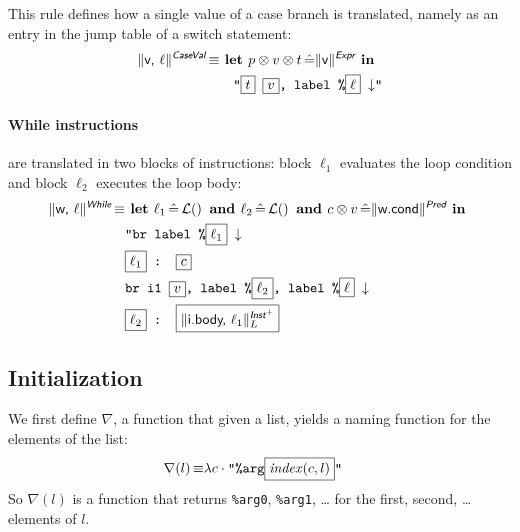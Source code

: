 \documentclass{llncs}
\newcommand{\trad}[2]{\ensuremath{\lVert \textsf{#1} \rVert^{\textit{#2}}}}
\newcommand{\nl}[0]{\ensuremath{\downarrow}}
\DeclareMathOperator{\isdef}{\equiv}
\DeclareMathOperator{\lbl}{\mathcal{L}()}
\newcommand{\llvm}[1]{\texttt{#1}}
\newcommand{\B}[1]{\textsf{#1}}
\newcommand{\ListOf}[1]{$\mbox{#1}^+$}
\newcommand{\LET}[0]{\textbf{ let }}
\DeclareMathOperator{\BE}{\hat{=}}
\newcommand{\IN}[0]{\textbf{ in }}
\newcommand{\AND}[0]{\textbf{ and }}
\newcommand{\PH}[1]{\framebox{$#1$}}
\newcommand{\sep}[0]{\otimes}
\begin{document}
This rule defines how a single value of a case branch is translated, namely
as an entry in the jump table of a switch statement:
\begin{align*}
  \trad{v, $\ell$}{\B{CaseVal}} \isdef & \LET p \sep v \sep t \BE \trad{v}{\B{Expr}} \IN \\
  & \quad \llvm{"\PH{t} \PH{v}, label \%\PH{\ell} \nl"}
\end{align*}

\paragraph{While instructions} are translated in two blocks of instructions:
block $\ell_1$ evaluates the loop condition and block $\ell_2$ executes the loop
body:
\begin{align*}
\begin{split}
\trad{w, $\ell$}{\B{While}} \isdef
  & \LET \ell_1 \BE \lbl \AND \ell_2 \BE \lbl \AND c \sep v \BE \trad{w.cond}{\B{Pred}} \IN \\
  & \llvm{"br label \%\PH{\ell_1} \nl} \\
  & \llvm{\PH{\ell_1} : \PH{c}} \\
  & \llvm{br i1 \PH{v}, label \%\PH{\ell_2}, label \%\PH{\ell} \nl} \\
  & \llvm{\PH{\ell_2} : \PH{\trad{i.body, $\ell_1$}{\ListOf{\B{Inst}}}_L}}
\end{split}
\end{align*}

\subsection{Initialization}
\label{sec:trad-init}

\newcommand{\argname}[0]{\ensuremath{\mathsf{\nabla}}}
\newcommand{\components}[0]{\ensuremath{\textsf{st-comp*}}}

We first define $\argname$, a function that given a list, yields a naming
function for the elements of the list:
\begin{align*}
  \argname(l) \isdef
  & \lambda c \cdot \llvm{"\%arg\PH{\mathit{index}(c, l)}"}
\end{align*}
So $\argname(l)$ is a function that returns \llvm{\%arg0}, \llvm{\%arg1}, \ldots
for the first, second, \ldots elements of $l$.
\end{document}
